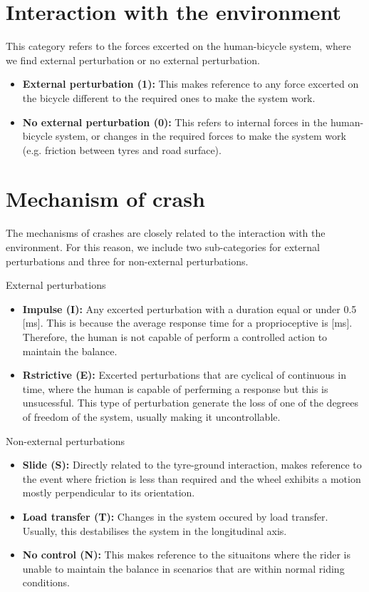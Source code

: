\documentclass{article}
\begin{document}
\section{Interaction with the environment}

This category refers to the forces excerted on the human-bicycle system, where we find external perturbation or no external perturbation.

\begin{itemize}
    \item \textbf{External perturbation (1):} This makes reference to any force excerted on the bicycle different to the required ones to make the system work. 
    \item \textbf{No external perturbation (0):} This refers to internal forces in the human-bicycle system, or changes in the required forces to make the system work (e.g. friction between tyres and road surface).
\end{itemize}

\section{Mechanism of crash}

The mechanisms of crashes are closely related to the interaction with the environment.
%
For this reason, we include two sub-categories for external perturbations and three for non-external perturbations.

External perturbations
\begin{itemize}
    \item \textbf{Impulse (I):} Any excerted perturbation with a duration equal or under 0.5 [ms].
        This is because the average response time for a proprioceptive {} is {} [ms].
        Therefore, the human is not capable of perform a controlled action to maintain the balance.
    \item \textbf{Rstrictive (E):} Excerted perturbations that are cyclical of continuous in time, where the human is capable of perferming a response but this is unsucessful.
        This type of perturbation generate the loss of one of the degrees of freedom of the system, usually making it uncontrollable.
\end{itemize}

Non-external perturbations
\begin{itemize}
    \item \textbf{Slide (S):} Directly related to the tyre-ground interaction, makes reference to the event where friction is less than required and the wheel exhibits a motion mostly perpendicular to its orientation.
    \item \textbf{Load transfer (T):} Changes in the system occured by load transfer.
        Usually, this destabilises the system in the longitudinal axis.
    \item \textbf{No control (N):} This makes reference to the situaitons where the rider is unable to maintain the balance in scenarios that are within normal riding conditions.
\end{itemize}
\end{document}
